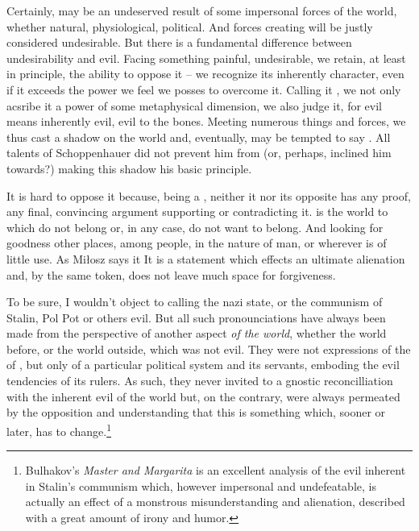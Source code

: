 {\pa Certainly,  may be an undeserved result of some
impersonal forces of the world, whether natural, physiological,
political.  And forces creating  will be justly considered
undesirable.  But there is a fundamental difference between
undesirability and evil.  Facing something painful, undesirable, we
retain, at least in principle, the ability to oppose it -- we
recognize its inherently  character, even if it
 exceeds the power we feel we posses to overcome it. 
Calling it , we not only acsribe it a power of some
metaphysical dimension, we also judge it, for evil means inherently
evil, evil to the bones.  Meeting numerous  things and
forces, we thus cast a shadow on the world and, eventually, may be
tempted to say .  All talents of Schoppenhauer
did not prevent him from (or, perhaps, inclined him towards?)  making 
this shadow his basic principle.


\pa It is hard to oppose it because, being a , neither it nor its opposite has any proof, any final,
convincing argument supporting or contradicting it.   is the world to which  do not belong or, in any case, do
not want to belong.  And looking for goodness other places, among
people, in the nature of man, or wherever is of little use.  As
Mi{\l}osz says it  It is a
statement which effects an ultimate alienation and, by the same token,
does not leave much space for forgiveness.

\subpa To be sure, I wouldn't object to calling the nazi state, or the
communism of Stalin, Pol Pot or others evil.  But all such
pronounciations have always been made from the perspective of another
aspect {\em of the world}, whether the world before, or the world
outside, which was not evil.  They were not expressions of the
 of , but only of a particular
political system and its servants, emboding the evil tendencies of its
rulers.  As such, they never invited to a gnostic reconcilliation with
the inherent evil of the world but, on the contrary, were always
permeated by the opposition and understanding that this is something
which, sooner or later, has to change.\footnote{Bulhakov's {\em Master
and Margarita} is an excellent analysis of the evil inherent in
Stalin's communism which, however impersonal and undefeatable, is
actually an effect of a monstrous misunderstanding and alienation,
described with a great amount of irony and humor.}

}

